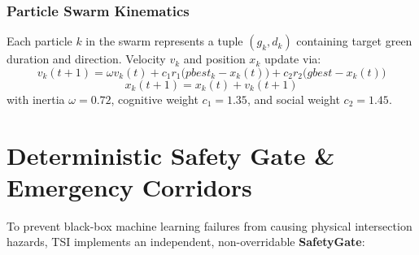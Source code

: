 \documentclass[11pt,a4paper]{article}
\begin{document}
\subsubsection{Particle Swarm Kinematics}
Each particle $k$ in the swarm represents a tuple $(g_k, d_k)$ containing target green duration and direction. Velocity $v_k$ and position $x_k$ update via:
\begin{equation}
v_k(t+1) = \omega v_k(t) + c_1 r_1 \big(pbest_k - x_k(t)\big) + c_2 r_2 \big(gbest - x_k(t)\big)
\end{equation}
\begin{equation}
x_k(t+1) = x_k(t) + v_k(t+1)
\end{equation}
with inertia $\omega = 0.72$, cognitive weight $c_1 = 1.35$, and social weight $c_2 = 1.45$.

\section{Deterministic Safety Gate \& Emergency Corridors}

To prevent black-box machine learning failures from causing physical intersection hazards, TSI implements an independent, non-overridable \textbf{SafetyGate}:
\end{document}
